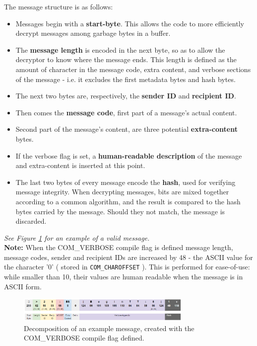 The message structure is as follows:
\begin{itemize}
\item[] Messages begin with a \textbf{start-byte}. This allows the code to more efficiently decrypt messages among garbage bytes in a buffer.
\item[] The \textbf{message length} is encoded in the next byte, so as to allow the decryptor to know where the message ends. This length is defined as the amount of character in the message code, extra content, and verbose sections of the message - i.e. it excludes the first metadata bytes and hash bytes.
\item[] The next two bytes are, respectively, the \textbf{sender ID} and \textbf{recipient ID}.
\item[] Then comes the \textbf{message code}, first part of a message's actual content.
\item[] Second part of the message's content, are three potential \textbf{extra-content} bytes.
\item[] If the verbose flag is set, a \textbf{human-readable description} of the message and extra-content is inserted at this point.
\item[] The last two bytes of every message encode the \textbf{hash}, used for verifying message integrity. When decrypting messages, bits are mixed together according to a common algorithm, and the result is compared to the hash bytes carried by the message. Should they not match, the message is discarded.
\end{itemize}

\textit{See Figure \ref{img:Message} for an example of a valid message.}\\

\textbf{Note:} When the COM\_VERBOSE compile flag is defined message length, message codes, sender and recipient IDs are increased by 48 - the ASCII value for the character '0' ( stored in \texttt{COM\_CHAROFFSET} ). This is performed for ease-of-use: while smaller than 10, their values are human readable when the message is in ASCII form. \\

\begin{figure}[ht]
   \centering
   \includegraphics[width=0.75\textwidth]{img/Message.png}
   \caption{Decomposition of an example message, created with the COM\_VERBOSE compile flag defined.}
   \label{img:Message}
\end{figure}

